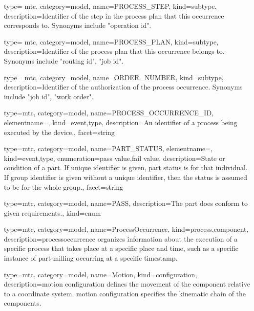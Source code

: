 {
  type= mtc,
  category=model,
  name={PROCESS\_STEP},
  kind={subtype},
  description={Identifier of the step in the process plan that this occurrence corresponds to. Synonyms include "operation id".}
}

{
  type= mtc,
  category=model,
  name={PROCESS\_PLAN},
  kind={subtype},
  description={Identifier of the process plan that this occurrence belongs to. Synonyms include "routing id", "job id".}
}

{
  type= mtc,
  category=model,
  name={ORDER\_NUMBER},
  kind={subtype},
  description={Identifier of the authorization of the process occurrence. Synonyms include "job id", "work order".}
}

{
  type=mtc,
  category=model,
  name={PROCESS\_OCCURRENCE\_ID},
  elementname=,
  kind={event,type},
  description={An identifier of a process being executed by the device.},
  facet={\gls{string}}
}

{
  type=mtc,
  category=model,
  name={PART\_STATUS},
  elementname=,
  kind={event,type},
  enumeration={\gls{pass value},\gls{fail value}},
  description={State or condition of a part.
  \newline If unique identifier is given, part status is for that individual. If group identifier is given without a unique identifier, then the status is assumed to be for the whole group.},
  facet={\gls{string}}
}

{
  type=mtc,
  category=model,
  name={PASS},
  description={The part does conform to given requirements.},
  kind={enum}
}

{
  type=mtc,
  category=model,
  name={ProcessOccurrence},
  kind={process,component},
  description={\gls{processoccurrence} \glspl{organize} information about the execution of a specific process that takes place at a specific place and time, such as a specific instance of part-milling occurring at a specific timestamp.}
}

{
  type=mtc,
  category=model,
  name={Motion},
  kind={configuration},
  description={\gls{motion configuration} defines the movement of the \gls{component} relative to a coordinate system. \gls{motion configuration} specifies the kinematic chain of the \gls{component}s.}
}

